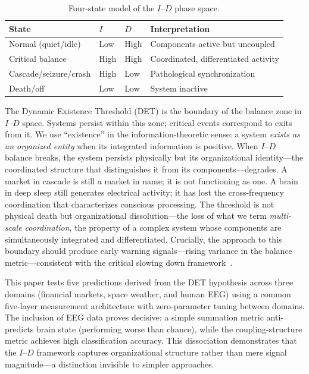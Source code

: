 \documentclass[aip,cha,reprint,amsmath,amssymb]{revtex4-2}
\begin{document}
\begin{table}[h]
\caption{Four-state model of the $I$--$D$ phase space.}
\centering
\begin{tabular}{llll}
State & $I$ & $D$ & Interpretation \\
\hline
Normal (quiet/idle) & Low & High & Components active but uncoupled \\
Critical balance & High & High & Coordinated, differentiated activity \\
Cascade/seizure/crash & High & Low & Pathological synchronization \\
Death/off & Low & Low & System inactive \\
\end{tabular}
\end{table}

The Dynamic Existence Threshold (DET) is the boundary of the balance zone in $I$--$D$ space. Systems persist within this zone; critical events correspond to exits from it. We use ``existence'' in the information-theoretic sense: a system \emph{exists as an organized entity} when its integrated information is positive. When $I$--$D$ balance breaks, the system persists physically but its organizational identity---the coordinated structure that distinguishes it from its components---degrades. A market in cascade is still a market in name; it is not functioning as one. A brain in deep sleep still generates electrical activity; it has lost the cross-frequency coordination that characterizes conscious processing. The threshold is not physical death but organizational dissolution---the loss of what we term \emph{multi-scale coordination}, the property of a complex system whose components are simultaneously integrated and differentiated. Crucially, the approach to this boundary should produce early warning signals---rising variance in the balance metric---consistent with the critical slowing down framework~\cite{scheffer2009}.

This paper tests five predictions derived from the DET hypothesis across three domains (financial markets, space weather, and human EEG) using a common five-layer measurement architecture with zero-parameter tuning between domains. The inclusion of EEG data proves decisive: a simple summation metric anti-predicts brain state (performing worse than chance), while the coupling-structure metric achieves high classification accuracy. This dissociation demonstrates that the $I$--$D$ framework captures organizational structure rather than mere signal magnitude---a distinction invisible to simpler approaches.
\end{document}
